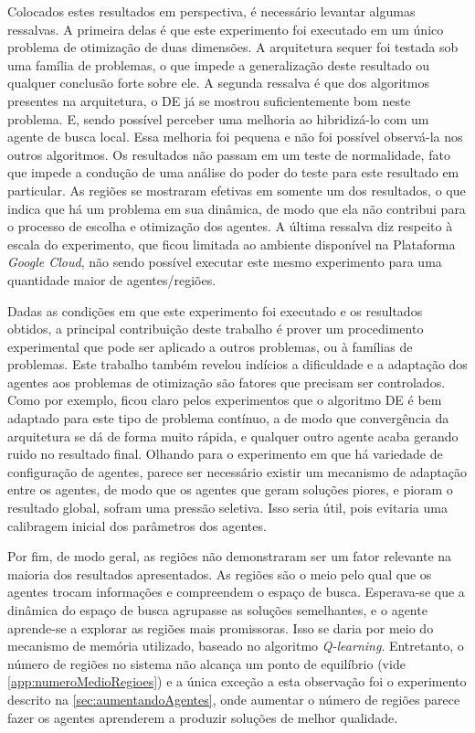 Colocados estes resultados em perspectiva, é necessário levantar algumas ressalvas. A primeira delas é que este experimento foi executado em um único problema de otimização de duas dimensões. A arquitetura sequer foi testada sob uma família de problemas, o que impede a generalização deste resultado ou qualquer conclusão forte sobre ele. A segunda ressalva é que dos algoritmos presentes na arquitetura, o DE já se mostrou suficientemente bom neste problema. E, sendo possível perceber uma melhoria ao hibridizá-lo com um agente de busca local. Essa melhoria foi pequena e não foi possível observá-la nos outros algoritmos. Os resultados não passam em um teste de normalidade, fato que impede a condução de uma análise do poder do teste para este resultado em particular. As regiões se mostraram efetivas em somente um dos resultados, o que indica que há um problema em sua dinâmica, de modo que ela não contribui para o processo de escolha e otimização dos agentes. A última ressalva diz respeito à escala do experimento, que ficou limitada ao ambiente disponível na Plataforma \textit{Google Cloud}, não sendo possível executar este mesmo experimento para uma quantidade maior de agentes/regiões.

Dadas as condições em que este experimento foi executado e os resultados obtidos, a principal contribuição deste trabalho é prover um procedimento experimental que pode ser aplicado a outros problemas, ou à famílias de problemas. Este trabalho também revelou indícios a dificuldade e a adaptação dos agentes aos problemas de otimização são fatores que precisam ser controlados. Como por exemplo, ficou claro pelos experimentos que o algoritmo DE é bem adaptado para este tipo de problema contínuo, a de modo que convergência da arquitetura se dá de forma muito rápida, e qualquer outro agente acaba gerando ruido no resultado final. Olhando para o experimento em que há variedade de configuração de agentes, parece ser necessário existir um mecanismo de adaptação entre os agentes, de modo que os agentes que geram soluções piores, e pioram o resultado global, sofram uma pressão seletiva. Isso seria útil, pois evitaria uma calibragem inicial dos parâmetros dos agentes. 

Por fim, de modo geral, as regiões não demonstraram ser um fator relevante na maioria dos resultados apresentados. As regiões são o meio pelo qual que os agentes trocam informações e compreendem o espaço de busca. Esperava-se que a dinâmica do espaço de busca agrupasse as soluções semelhantes, e o agente aprende-se a explorar as regiões mais promissoras. Isso se daria por meio do mecanismo de memória utilizado, baseado no algoritmo \textit{Q-learning}. Entretanto, o número de regiões no sistema não alcança um ponto de equilíbrio (vide \autoref{app:numeroMedioRegioes}) e a única exceção a esta observação foi o experimento descrito na \autoref{sec:aumentandoAgentes}, onde aumentar o número de regiões parece fazer os agentes aprenderem a produzir soluções de melhor qualidade. 